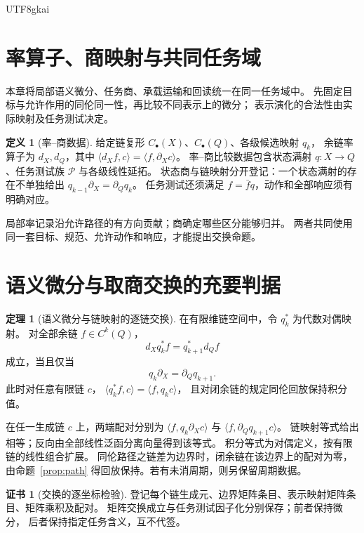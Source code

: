 \documentclass[12pt]{report}
\makeatletter
\theoremstyle{definition}
\newtheorem{definition}{定义}[chapter]
\newtheorem{theorem}{定理}[chapter]
\newtheorem{Certificate}{证书}[chapter]
\renewenvironment{proof}[1][\proofname]{\par
  \pushQED{\qed}\normalfont
  \topsep6\p@\@plus6\p@\relax
  \trivlist
  \item[\hskip\labelsep\normalfont #1\@addpunct{.}]\ignorespaces
}{
  \popQED\endtrivlist\@endpefalse
}
\makeatother
\begin{document}
\begin{CJK*}{UTF8}{gkai}
\section{率算子、商映射与共同任务域}
本章将局部语义微分、任务商、承载运输和回读统一在同一任务域中。
先固定目标与允许作用的同伦同一性，再比较不同表示上的微分；
表示演化的合法性由实际映射及任务测试决定。
\begin{definition}[率--商数据]
给定链复形 \(C_\bullet(X)\)、\(C_\bullet(Q)\)、各级候选映射 \(q_k\)，
余链率算子为 \(d_X,d_Q\)，其中
\(\langle d_Xf,c\rangle=\langle f,\partial_Xc\rangle\)。
率--商比较数据包含状态满射 \(q:X\to Q\)、任务测试族 \(\mathcal P\) 与各级线性延拓。
状态商与链映射分开登记：一个状态满射的存在不单独给出
\(q_{k-1}\partial_X=\partial_Qq_k\)。
任务测试还须满足 \(f=\bar f q\)，动作和全部响应须有明确对应。
\end{definition}
局部率记录沿允许路径的有方向贡献；商确定哪些区分能够归并。
两者共同使用同一套目标、规范、允许动作和响应，才能提出交换命题。

\section{语义微分与取商交换的充要判据}
\begin{theorem}[语义微分与链映射的逐链交换]
\label{thm:map-commutation}
在有限维链空间中，令 \(q_k^*\) 为代数对偶映射。
对全部余链 \(f\in C^k(Q)\)，
\[
d_Xq_k^*f=q_{k+1}^*d_Qf
\]
成立，当且仅当
\[
q_k\partial_X=\partial_Qq_{k+1}.
\]
此时对任意有限链 \(c\)，
\(\langle q_k^*f,c\rangle=\langle f,q_kc\rangle\)，
且对闭余链的规定同伦回放保持积分值。
\end{theorem}
\begin{proof}
在任一生成链 \(c\) 上，两端配对分别为
\(\langle f,q_k\partial_Xc\rangle\) 与
\(\langle f,\partial_Qq_{k+1}c\rangle\)。
链映射等式给出相等；反向由全部线性泛函分离向量得到该等式。
积分等式为对偶定义，按有限链的线性组合扩展。
同伦路径之链差为边界时，闭余链在该边界上的配对为零，
由命题~\ref{prop:path} 得回放保持。若有未消周期，则另保留周期数据。
\end{proof}
\begin{Certificate}[交换的逐坐标检验]
登记每个链生成元、边界矩阵条目、表示映射矩阵条目、矩阵乘积及配对。
矩阵交换成立与任务测试因子化分别保存；前者保持微分，
后者保持指定任务含义，互不代签。
\end{Certificate}


\end{CJK*}
\end{document}
